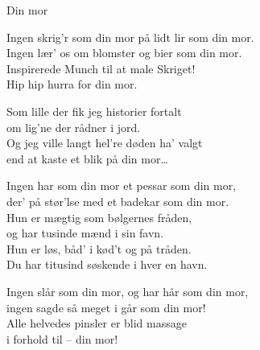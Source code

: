 \begin{song}{Din mor}
  \begin{SBVerse}
    Ingen skrig’r som din mor på lidt lir som din mor.\\
    Ingen lær’ os om blomster og bier som din mor.\\
    Inspirerede Munch til at male Skriget!\\
    Hip hip hurra for din mor.
  \end{SBVerse}

  \begin{SBSection*}
    Som lille der fik jeg historier fortalt\\
    om lig’ne der rådner i jord.\\
    Og jeg ville langt hel’re døden ha’ valgt\\
    end at kaste et blik på din mor\ldots
  \end{SBSection*}

  \begin{SBVerse}
    Ingen har som din mor et pessar som din mor,\\
    der’ på stør’lse med et badekar som din mor.\\
    Hun er mægtig som bølgernes fråden,\\
    og har tusinde mænd i sin favn.\\
    Hun er løs, båd’ i kød’t og på tråden.\\
    Du har titusind søskende i hver en havn.
  \end{SBVerse}

  \begin{SBVerse}
    Ingen slår som din mor, og har hår som din mor,\\
    ingen sagde så meget i går som din mor!\\
    Alle helvedes pinsler er blid massage\\
    i forhold til – din mor!
  \end{SBVerse}
\end{song}